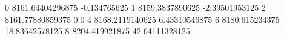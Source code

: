 0 8161.64404296875 -0.134765625
1 8159.3837890625 -2.39501953125
2 8161.77880859375 0.0
4 8168.2119140625 6.43310546875
6 8180.615234375 18.83642578125
8 8204.419921875 42.64111328125
